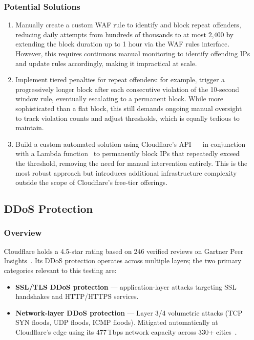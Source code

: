 \documentclass[12pt, a4paper]{report}   %
\begin{document}
\subsubsection{Potential Solutions}

\begin{enumerate}
    \item Manually create a custom WAF rule to identify and block repeat offenders, reducing daily attempts from hundreds of thousands to at most 2,400 by 
    extending the block duration up to 1 hour via the WAF rules interface. However, 
    this requires continuous manual monitoring to identify offending IPs and update 
    rules accordingly, making it impractical at scale.
    
    \item Implement tiered penalties for repeat offenders: for example, trigger a 
    progressively longer block after each consecutive violation of the 10-second 
    window rule, eventually escalating to a permanent block. While more sophisticated 
    than a flat block, this still demands ongoing manual oversight to track violation 
    counts and adjust thresholds, which is equally tedious to maintain.
    
    \item Build a custom automated solution using Cloudflare's 
    API~\cite{cf-api-lockdown} ~\cite{cf-api-lockdown-create} in conjunction with a Lambda 
    function~\cite{aws-lambda} to permanently block IPs that repeatedly exceed the 
    threshold, removing the need for manual intervention entirely. This is the most 
    robust approach but introduces additional infrastructure complexity outside the 
    scope of Cloudflare's free-tier offerings.
\end{enumerate}

\subsection{DDoS Protection}
\label{sec:cf-ddos}

\subsubsection{Overview}

Cloudflare holds a 4.5-star rating based on 246 verified reviews on Gartner Peer
Insights~\cite{gartner-cf}. Its DDoS protection operates across multiple layers; the
two primary categories relevant to this testing are:

\begin{itemize}
  \item \textbf{SSL/TLS DDoS protection} --- application-layer attacks targeting SSL
        handshakes and HTTP/HTTPS services.
  \item \textbf{Network-layer DDoS protection} --- Layer 3/4 volumetric attacks (TCP 
        SYN floods, UDP floods, ICMP floods). Mitigated automatically at Cloudflare's 
        edge using its 477\,Tbps network capacity across 330+ 
        cities~\cite{cf-ddos}.
\end{itemize}
\end{document}
